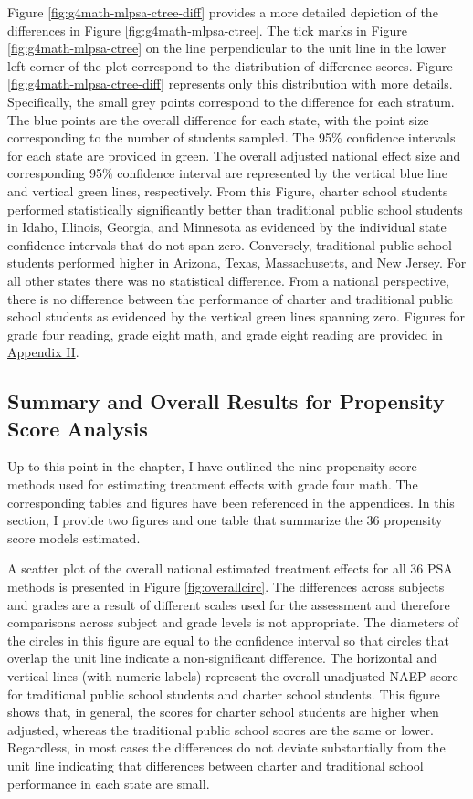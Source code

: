 \documentclass[letterpaper,12p,twoside]{article} %
\begin{document}
Figure \ref{fig:g4math-mlpsa-ctree-diff} provides a more detailed depiction of the differences in Figure \ref{fig:g4math-mlpsa-ctree}. The tick marks in Figure \ref{fig:g4math-mlpsa-ctree} on the line perpendicular to the unit line in the lower left corner of the plot correspond to the distribution of difference scores. Figure \ref{fig:g4math-mlpsa-ctree-diff} represents only this distribution with more details. Specifically, the small grey points correspond to the difference for each stratum. The blue points are the overall difference for each state, with the point size corresponding to the number of students sampled. The 95\% confidence intervals for each state are provided in green. The overall adjusted national effect size and corresponding 95\% confidence interval are represented by the vertical blue line and vertical green lines, respectively. From this Figure, charter school students performed statistically significantly better than traditional public school students in Idaho, Illinois, Georgia, and Minnesota as evidenced by the individual state confidence intervals that do not span zero. Conversely, traditional public school students performed higher in Arizona, Texas, Massachusetts, and New Jersey. For all other states there was no statistical difference. From a national perspective, there is no difference between the performance of charter and traditional public school students as evidenced by the vertical green lines spanning zero. Figures for grade four reading, grade eight math, and grade eight reading are provided in \hyperref[appendixH]{Appendix H}.


\subsection{Summary and Overall Results for Propensity Score Analysis}

Up to this point in the chapter, I have outlined the nine propensity score methods used for estimating treatment effects with grade four math. The corresponding tables and figures have been referenced in the appendices. In this section, I provide two figures and one table that summarize the 36 propensity score models estimated.

A scatter plot of the overall national estimated treatment effects for all 36 PSA methods is presented in Figure \ref{fig:overallcirc}. The differences across subjects and grades are a result of different scales used for the assessment and therefore comparisons across subject and grade levels is not appropriate. The diameters of the circles in this figure are equal to the confidence interval so that circles that overlap the unit line indicate a non-significant difference. The horizontal and vertical lines (with numeric labels) represent the overall unadjusted NAEP score for traditional public school students and charter school students. This figure shows that, in general, the scores for charter school students are higher when adjusted, whereas the traditional public school scores are the same or lower. Regardless, in most cases the differences do not deviate substantially from the unit line indicating that differences between charter and traditional school performance in each state are small.
\end{document}

